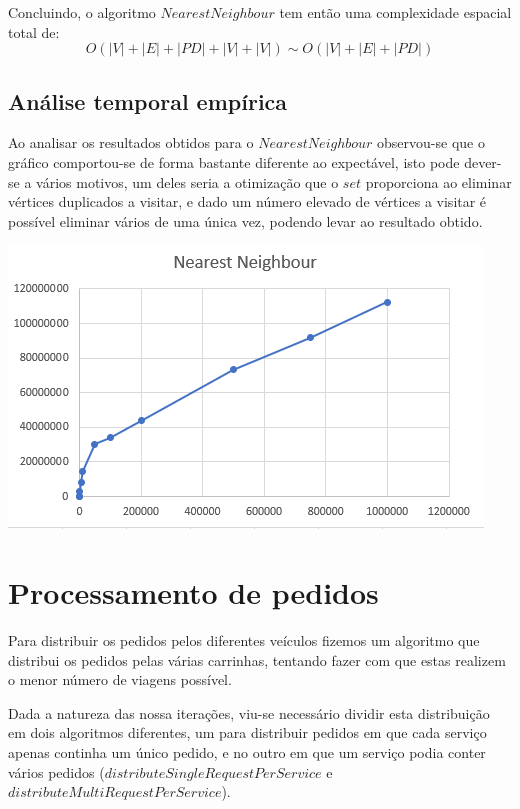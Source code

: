 \documentclass[article, a4paper, 12pt, oneside]{memoir}
\begin{document}
Concluindo, o algoritmo $NearestNeighbour$ tem então uma complexidade espacial total de:
\begin{equation}
O(|V|+|E|+|PD|+|V|+|V|) \sim O(|V|+|E|+|PD|)
\end{equation}

\subsection{Análise temporal empírica}
Ao analisar os resultados obtidos para o $NearestNeighbour$ observou-se que o gráfico comportou-se de forma bastante diferente ao expectável, isto pode dever-se a vários motivos, um deles seria a otimização que o $set$ proporciona ao eliminar vértices duplicados a visitar, e dado um número elevado de vértices a visitar é possível eliminar vários de uma única vez, podendo levar ao resultado obtido.

\begin{center}
\includegraphics[scale=0.5]{nearest_empiric.png}
\end{center}



\section{Processamento de pedidos}
Para distribuir os pedidos pelos diferentes veículos fizemos um algoritmo que distribui os pedidos pelas várias carrinhas,
tentando fazer com que estas realizem o menor número de viagens possível.

Dada a natureza das nossa iterações, viu-se necessário dividir esta distribuição em dois algoritmos diferentes, um para distribuir pedidos em que cada serviço apenas continha um único pedido, e no outro em que um serviço podia conter vários pedidos ($distributeSingleRequestPerService$ e $distributeMultiRequestPerService$).
\end{document}
